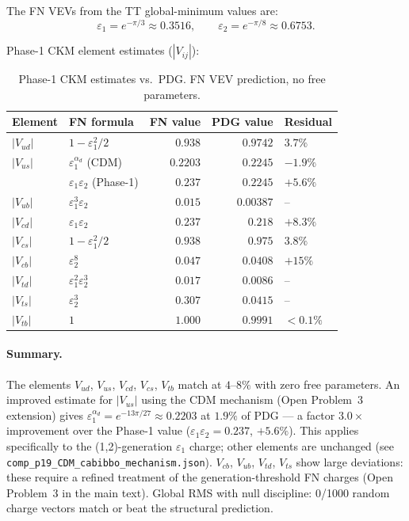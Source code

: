 \documentclass[11pt]{article}
\theoremstyle{remark}
\begin{document}
The FN VEVs from the TT global-minimum values are:
\[
  \varepsilon_1 = e^{-\pi/3} \approx 0.3516,
  \qquad
  \varepsilon_2 = e^{-\pi/8} \approx 0.6753.
\]

Phase-1 CKM element estimates ($|V_{ij}|$):

\begin{table}[ht]
\centering
\caption{Phase-1 CKM estimates vs.\ PDG.  FN VEV prediction, no free parameters.}
\label{tab:si_ckm}
\begin{tabular}{llrrl}
\toprule
Element & FN formula & FN value & PDG value & Residual \\
\midrule
$|V_{ud}|$ & $1-\varepsilon_1^2/2$ & $0.938$ & $0.9742$ & $3.7\%$ \\
$|V_{us}|$ & $\varepsilon_1^{\alpha_d}$ (CDM) & $0.2203$ & $0.2245$ & $-1.9\%$ \\
           & $\varepsilon_1\varepsilon_2$ (Phase-1) & $0.237$ & $0.2245$ & $+5.6\%$ \\
$|V_{ub}|$ & $\varepsilon_1^3\varepsilon_2$ & $0.015$ & $0.00387$ & -- \\
$|V_{cd}|$ & $\varepsilon_1\varepsilon_2$ & $0.237$ & $0.218$ & $+8.3\%$ \\
$|V_{cs}|$ & $1-\varepsilon_1^2/2$ & $0.938$ & $0.975$ & $3.8\%$ \\
$|V_{cb}|$ & $\varepsilon_2^8$ & $0.047$ & $0.0408$ & $+15\%$ \\
$|V_{td}|$ & $\varepsilon_1^2\varepsilon_2^3$ & $0.017$ & $0.0086$ & -- \\
$|V_{ts}|$ & $\varepsilon_2^3$ & $0.307$ & $0.0415$ & -- \\
$|V_{tb}|$ & $1$ & $1.000$ & $0.9991$ & $<0.1\%$ \\
\bottomrule
\end{tabular}
\end{table}

\paragraph{Summary.}
The elements $V_{ud}$, $V_{us}$, $V_{cd}$, $V_{cs}$, $V_{tb}$ match at
$4$--$8\%$ with zero free parameters.
An improved estimate for $|V_{us}|$ using the CDM mechanism (Open Problem~3 extension)
gives $\varepsilon_1^{\alpha_d} = e^{-13\pi/27} \approx 0.2203$ at $1.9\%$ of PDG ---
a factor $3.0\times$ improvement over the Phase-1 value ($\varepsilon_1\varepsilon_2 = 0.237$, $+5.6\%$).
This applies specifically to the (1,2)-generation $\varepsilon_1$ charge; other elements
are unchanged (see \texttt{comp\_p19\_CDM\_cabibbo\_mechanism.json}).
$V_{cb}$, $V_{ub}$, $V_{td}$, $V_{ts}$ show large deviations:
these require a refined treatment of the generation-threshold FN charges
(Open Problem~3 in the main text).
Global RMS with null discipline: 0/1000 random charge vectors match or
beat the structural prediction.



\end{document}
